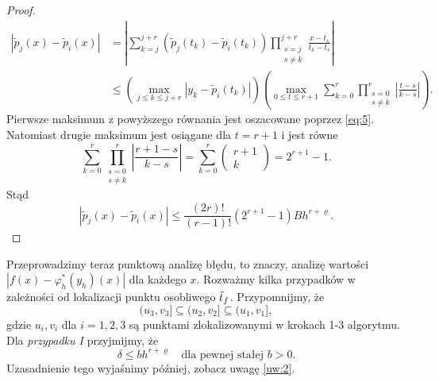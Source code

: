 \documentclass[oik, pdftex, man]{mgrwms}
\begin{document}
\begin{proof}
        \begin{equation} \label{eq:28}
            \begin{aligned}
                \left|\tilde{p}_{j}(x)-\tilde{p}_{i}(x)\right| &=\left|\sum_{k=j}^{j+r}\left(\tilde{p}_{j}\left(t_{k}\right)-\tilde{p}_{i}\left(t_{k}\right)\right) \prod_{\substack{s=j \\ s \neq k}}^{j+r} \frac{x-t_{s}}{t_{k}-t_{s}}\right| \\
                & \leq\left(\max _{j \leq k \leq j+r}\left|y_{k}-\tilde{p}_{i}\left(t_{k}\right)\right|\right)\left(\max _{0 \leq t \leq r+1} \sum_{k=0}^{r} \prod_{\substack{s=0 \\ s \neq k}}^{r}\left|\frac{t-s}{k-s}\right|\right).
            \end{aligned}                
        \end{equation}
        Pierwsze maksimum z powyższego równania jest oszacowane poprzez \eqref{eq:5}. Natomiast drugie maksimum jest osiągane dla $t=r+1$ i jest równe
        \begin{equation*}
            \sum_{k=0}^{r} \prod_{\substack{s=0 \\ s \neq k}}^{r}\left|\frac{r+1-s}{k-s}\right|=\sum_{k=0}^{r}\left(\begin{array}{c} r+1 \\ k\end{array}\right)=2^{r+1}-1.
        \end{equation*}
        Stąd
        \begin{equation*}
            \left|\tilde{p}_{j}(x)-\tilde{p}_{i}(x)\right| \leq \frac{(2 r) !}{(r-1) !}\left(2^{r+1}-1\right) B h^{r+\varrho}.
        \end{equation*}
    \end{proof}

    Przeprowadzimy teraz punktową analizę błędu, to znaczy, analizę wartości $|f(x) - \varphi_{h}^{*}(y_h)(x)|$ dla każdego $x$. Rozważmy kilka przypadków w zależności od lokalizacji punktu osobliwego $\hat{t}_{f}$. Przypomnijmy, że
    \begin{equation*}
        (u_{3}, v_{3}] \subseteq (u_{2}, v_{2}] \subseteq (u_{1}, v_{1}],
    \end{equation*}
    gdzie $u_{i}, v_{i}$ dla $i=1,2,3$ są punktami zlokalizowanymi w krokach 1-3 algorytmu. Dla \textit{przypadku I} przyjmijmy, że
    \begin{equation} \label{eq:algMP_7}
        \delta \leq b h^{r+\varrho} \quad \text{dla pewnej stałej } b>0.
    \end{equation}
    Uzasadnienie tego wyjaśnimy później, zobacz uwagę \ref{uw:2}. \vspace{5pt}
\end{document}
